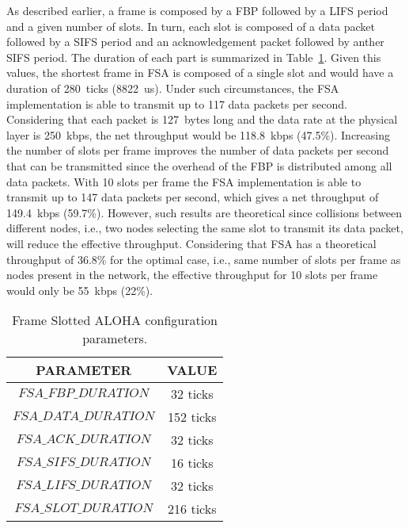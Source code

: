 As described earlier, a frame is composed by a FBP followed by a LIFS period and a given number of slots. In turn, each slot is composed of a data packet followed by a SIFS period and an acknowledgement packet followed by anther SIFS period. The duration of each part is summarized in Table~\ref{tab:06-fsa}. Given this values, the shortest frame in FSA is composed of a single slot and would have a duration of 280~ticks (8822~us). Under such circumstances, the FSA implementation is able to transmit up to 117 data packets per second. Considering that each packet is 127~bytes long and the data rate at the physical layer is 250~kbps, the net throughput would be 118.8~kbps (47.5\%). Increasing the number of slots per frame improves the number of data packets per second that can be transmitted since the overhead of the FBP is distributed among all data packets. With 10 slots per frame the FSA implementation is able to transmit up to 147 data packets per second, which gives a net throughput of 149.4~kbps (59.7\%). However, such results are theoretical since collisions between different nodes, i.e., two nodes selecting the same slot to transmit its data packet, will reduce the effective throughput. Considering that FSA has a theoretical throughput of 36.8\% for the optimal case, i.e., same number of slots per frame as nodes present in the network, the effective throughput for 10 slots per frame would only be 55~kbps (22\%).

\begin{table}[!ht]
\centering
\begin{tabular}{|c|c|}
\hline
\textbf{PARAMETER} & \textbf{VALUE} \\ \hline
$FSA\_FBP\_DURATION$ & 32 ticks \\ \hline
$FSA\_DATA\_DURATION$ & 152 ticks \\ \hline
$FSA\_ACK\_DURATION$ & 32 ticks \\ \hline
$FSA\_SIFS\_DURATION$ & 16 ticks \\ \hline
$FSA\_LIFS\_DURATION$ & 32 ticks \\ \hline
$FSA\_SLOT\_DURATION$ & 216 ticks\\
\hline
\end{tabular}
\label{tab:06-fsa}
\caption{Frame Slotted ALOHA configuration parameters.}
\end{table}

